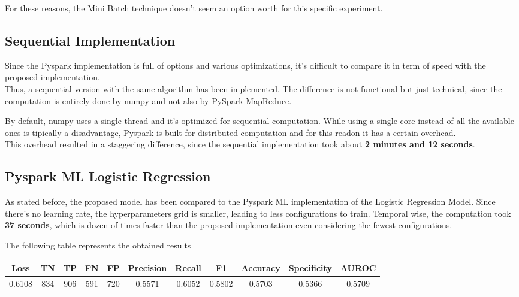 \documentclass[
	letterpaper, %
	10pt, %
]{class}
\begin{document}
For these reasons, the Mini Batch technique doesn't seem an option worth for this specific experiment.

\subsection{Sequential Implementation}

Since the Pyspark implementation is full of options and various optimizations, it's difficult to compare it in term of speed with the proposed implementation.\\
Thus, a sequential version with the same algorithm has been implemented. The difference is not functional but just technical, since the computation is entirely done by numpy and not also by PySpark MapReduce.

By default, numpy uses a single thread and it's optimized for sequential computation. While using a single core instead of all the available ones is tipically a disadvantage, Pyspark is built for distributed computation and for this readon it has a certain overhead.\\
This overhead resulted in a staggering difference, since the sequential implementation took about \textbf{2 minutes and 12 seconds}.

\subsection{Pyspark ML Logistic Regression}

As stated before, the proposed model has been compared to the Pyspark ML implementation of the Logistic Regression Model.
Since there's no learning rate, the hyperparameters grid is smaller, leading to less configurations to train.
Temporal wise, the computation took \textbf{37 seconds}, which is dozen of times faster than the proposed implementation even considering the fewest configurations.

The following table represents the obtained results

\begin{center}
    \begin{tabular}{ |c|c|c|c|c|c|c|c|c|c|c| }
        \hline
        Loss   & TN  & TP  & FN  & FP  & Precision & Recall & F1     & Accuracy & Specificity & AUROC  \\
        \hline
        0.6108 & 834 & 906 & 591 & 720 & 0.5571    & 0.6052 & 0.5802 & 0.5703   & 0.5366      & 0.5709 \\
        \hline
    \end{tabular}
\end{center}
\end{document}
